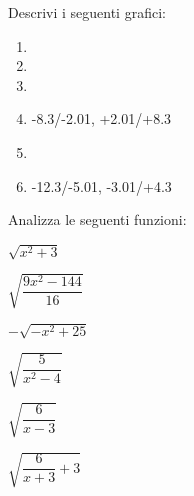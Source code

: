 \begin{esercizio}\label{ese:stufun.4g}
Descrivi i seguenti grafici:
\begin{multicols}{2}
 \begin{enumerate} [left=0pt, label=\alph*)]
  \item \myp 
{} %
  \item \myp 
{} %
  \item \myp 
{}%
\vspace{1mm}
  \item \myp 
{}
{-8.3/-2.01, +2.01/+8.3} %
  \item \myp 
{} %
\item \myp 
{}
{-12.3/-5.01, -3.01/+4.3} %
 \end{enumerate}
\end{multicols}
\end{esercizio}

\begin{esercizio}\label{ese:stufun.4e}
Analizza le seguenti funzioni:
\begin{multicols}{3}
 \begin{enumeratea}
  \item \(\sqrt{x^2 +3}\) %
  \item \(\sqrt{\dfrac{9x^2 -144}{16}}\) %
  \item \(-\sqrt{-x^2 +25}\) %
  \item \(\sqrt{\dfrac{5}{x^2 -4}}\) %
  \item \(\sqrt{\dfrac{6}{x -3}}\) %
  \item \(\sqrt{\dfrac{6}{x +3}+3}\) %
 \end{enumeratea}
\end{multicols}
\end{esercizio}

\bigskip

\begin{comment}
 
\begin{esercizio}
\label{ese:}
\end{esercizio}

\end{comment}

